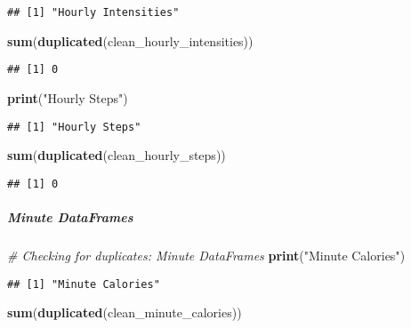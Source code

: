 \documentclass[
]{article}
\newenvironment{Shaded}{\begin{snugshade}}{\end{snugshade}}
\newcommand{\CommentTok}[1]{\textcolor[rgb]{0.56,0.35,0.01}{\textit{#1}}}
\newcommand{\FunctionTok}[1]{\textcolor[rgb]{0.13,0.29,0.53}{\textbf{#1}}}
\newcommand{\NormalTok}[1]{#1}
\newcommand{\StringTok}[1]{\textcolor[rgb]{0.31,0.60,0.02}{#1}}
\begin{document}
\begin{verbatim}
## [1] "Hourly Intensities"
\end{verbatim}

\begin{Shaded}
\begin{Highlighting}[]
\FunctionTok{sum}\NormalTok{(}\FunctionTok{duplicated}\NormalTok{(clean\_hourly\_intensities))}
\end{Highlighting}
\end{Shaded}

\begin{verbatim}
## [1] 0
\end{verbatim}

\begin{Shaded}
\begin{Highlighting}[]
\FunctionTok{print}\NormalTok{(}\StringTok{"Hourly Steps"}\NormalTok{)}
\end{Highlighting}
\end{Shaded}

\begin{verbatim}
## [1] "Hourly Steps"
\end{verbatim}

\begin{Shaded}
\begin{Highlighting}[]
\FunctionTok{sum}\NormalTok{(}\FunctionTok{duplicated}\NormalTok{(clean\_hourly\_steps))}
\end{Highlighting}
\end{Shaded}

\begin{verbatim}
## [1] 0
\end{verbatim}

\hypertarget{minute-dataframes-5}{%
\subparagraph{Minute DataFrames}\label{minute-dataframes-5}}

\begin{Shaded}
\begin{Highlighting}[]
\CommentTok{\# Checking for duplicates: Minute DataFrames}
\FunctionTok{print}\NormalTok{(}\StringTok{"Minute Calories"}\NormalTok{)}
\end{Highlighting}
\end{Shaded}

\begin{verbatim}
## [1] "Minute Calories"
\end{verbatim}

\begin{Shaded}
\begin{Highlighting}[]
\FunctionTok{sum}\NormalTok{(}\FunctionTok{duplicated}\NormalTok{(clean\_minute\_calories))}
\end{Highlighting}
\end{Shaded}
\end{document}
